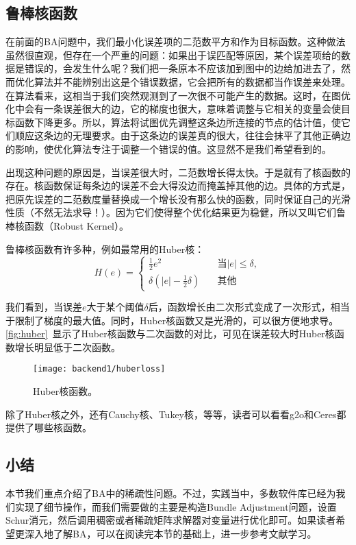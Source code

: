 \subsection{鲁棒核函数}
在前面的BA问题中，我们最小化误差项的二范数平方和作为目标函数。这种做法虽然很直观，但存在一个严重的问题：如果出于误匹配等原因，某个误差项给的数据是错误的，会发生什么呢？我们把一条原本不应该加到图中的边给加进去了，然而优化算法并不能辨别出这是个错误数据，它会把所有的数据都当作误差来处理。在算法看来，这相当于我们突然观测到了一次很不可能产生的数据。这时，在图优化中会有一条误差很大的边，它的梯度也很大，意味着调整与它相关的变量会使目标函数下降更多。所以，算法将试图优先调整这条边所连接的节点的估计值，使它们顺应这条边的无理要求。由于这条边的误差真的很大，往往会抹平了其他正确边的影响，使优化算法专注于调整一个错误的值。这显然不是我们希望看到的。

出现这种问题的原因是，当误差很大时，二范数增长得太快。于是就有了核函数的存在。核函数保证每条边的误差不会大得没边而掩盖掉其他的边。具体的方式是，把原先误差的二范数度量替换成一个增长没有那么快的函数，同时保证自己的光滑性质（不然无法求导！）。因为它们使得整个优化结果更为稳健，所以又叫它们鲁棒核函数（Robust Kernel）。

鲁棒核函数有许多种，例如最常用的Huber核：
\begin{equation}
H\left( e \right) = 
\left\{ 
\begin{array}{ll}
\frac{1}{2}{e^2} &\quad \text{当} |e| \leqslant \delta, \\
\delta \left( {\left| e \right| - \frac{1}{2}\delta } \right) &\quad \text{其他}
\end{array} \right.
\end{equation}

我们看到，当误差$e$大于某个阈值$\delta$后，函数增长由二次形式变成了一次形式，相当于限制了梯度的最大值。同时，Huber核函数又是光滑的，可以很方便地求导。\autoref{fig:huber}~显示了Huber核函数与二次函数的对比，可见在误差较大时Huber核函数增长明显低于二次函数。

\begin{figure}[!htp]
	\centering
	\texttt{[image: backend1/huberloss]}
	\caption{Huber核函数。}
	\label{fig:huber}
\end{figure}

除了Huber核之外，还有Cauchy核、Tukey核，等等，读者可以看看g2o和Ceres都提供了哪些核函数。

\subsection{小结}
本节我们重点介绍了BA中的稀疏性问题。不过，实践当中，多数软件库已经为我们实现了细节操作，而我们需要做的主要是构造Bundle Adjustment问题，设置Schur消元，然后调用稠密或者稀疏矩阵求解器对变量进行优化即可。如果读者希望更深入地了解BA，可以在阅读完本节的基础上，进一步参考文献\cite{Triggs2000}学习。

